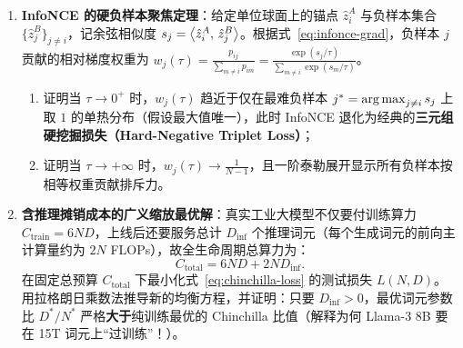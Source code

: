 \begin{enumerate}
  \item[\textbf{5.5.3}] \textbf{InfoNCE 的硬负样本聚焦定理}：给定单位球面上的锚点 $\hat{z}_i^A$ 与负样本集合 $\{\hat{z}_j^B\}_{j\ne i}$，记余弦相似度 $s_j = \left\langle \hat{z}_i^A,\, \hat{z}_j^B \right\rangle$。根据式~\eqref{eq:infonce-grad}，负样本 $j$ 贡献的相对梯度权重为 $w_j(\tau) = \frac{p_{ij}}{\sum_{m \ne i} p_{im}} = \frac{\exp(s_j / \tau)}{\sum_{m \ne i} \exp(s_m / \tau)}$。
  \begin{enumerate}
    \item 证明当 $\tau \to 0^+$ 时，$w_j(\tau)$ 趋近于仅在最难负样本 $j^* = \operatorname*{arg\,max}_{j \ne i} s_j$ 上取 $1$ 的单热分布（假设最大值唯一），此时 InfoNCE 退化为经典的\textbf{三元组硬挖掘损失（Hard-Negative Triplet Loss）}；
    \item 证明当 $\tau \to +\infty$ 时，$w_j(\tau) \to \frac{1}{N-1}$，且一阶泰勒展开显示所有负样本按相等权重贡献排斥力。
  \end{enumerate}

  \item[\textbf{5.5.4}] \textbf{含推理摊销成本的广义缩放最优解}：真实工业大模型不仅要付训练算力 $C_{\text{train}} = 6 N D$，上线后还要服务总计 $D_{\text{inf}}$ 个推理词元（每个生成词元的前向主计算量约为 $2 N$ FLOPs），故全生命周期总算力为：
  \[
    C_{\text{total}} = 6 N D + 2 N D_{\text{inf}}.
  \]
  在固定总预算 $C_{\text{total}}$ 下最小化式~\eqref{eq:chinchilla-loss} 的测试损失 $L(N, D)$。用拉格朗日乘数法推导新的均衡方程，并证明：只要 $D_{\text{inf}} > 0$，最优词元参数比 $D^* / N^*$ 严格\textbf{大于}纯训练最优的 Chinchilla 比值（解释为何 Llama-3 8B 要在 15T 词元上“过训练”！）。
\end{enumerate}


